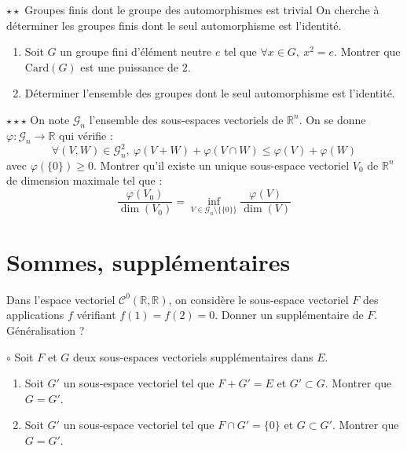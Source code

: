 \documentclass[french,a4paper]{article}
\newcommand{\R}{\mathbb{R}}
\newcommand{\card}{\text{Card}}
\theoremstyle{plain}
\theoremstyle{definition}
\theoremstyle{remark}
\begin{document}
\begin{ex}[Ulm]{$\star\star$ Groupes finis dont le groupe des automorphismes est trivial}
	On cherche à déterminer les groupes finis dont le seul automorphisme est l'identité.
	\begin{enumerate}
		\item Soit $G$ un groupe fini d'élément neutre $e$ tel que $\forall x\in G,\ x^2=e$. Montrer que $\card(G)$ est une puissance de $2$.
		\item Déterminer l'ensemble des groupes dont le seul automorphisme est l'identité.
	\end{enumerate}
\end{ex}

\begin{ex}[Ulm]{$\star\star\star$}
	On note $\mathcal{G}_n$ l'ensemble des sous-espaces vectoriels de $\R^n$. On se donne $\varphi:\mathcal{G}_n\to\R$ qui vérifie : $$\forall (V,W)\in\mathcal{G}_n^2,\ \varphi(V+W)+\varphi(V\cap W)\leqslant\varphi(V)+\varphi(W)$$ avec $\varphi(\{0\})\geqslant 0$. Montrer qu'il existe un unique sous-espace vectoriel $V_0$ de $\R^n$ de dimension maximale tel que : $$\frac{\varphi(V_0)}{\dim(V_0)}=\underset{V\in\mathcal{G}_n\setminus\{\{0\}\}}{\inf}\frac{\varphi(V)}{\dim(V)}$$
\end{ex}

\section{Sommes, supplémentaires}

\begin{ex}[Moulin.EV.26]{}
	Dans l'espace vectoriel $\mathcal{C}^0(\R,\R)$, on considère le sous-espace vectoriel $F$ des applications $f$ vérifiant $f(1)=f(2)=0$. Donner un supplémentaire de $F$. Généralisation ?
\end{ex}

\begin{ex}[Moulin.EV.27]{$\circ$}
	Soit $F$ et $G$ deux sous-espaces vectoriels supplémentaires dans $E$.
	\begin{enumerate}
		\item Soit $G'$ un sous-espace vectoriel tel que $F+G'=E$ et $G'\subset G$. Montrer que $G=G'$.
		\item Soit $G'$ un sous-espace vectoriel tel que $F\cap G'=\{0\}$ et $G\subset G'$. Montrer que $G=G'$.
	\end{enumerate}
\end{ex}
\end{document}
